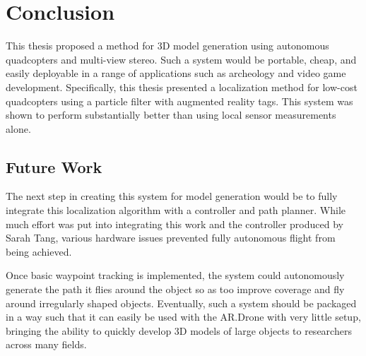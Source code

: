\chapter{Conclusion\label{ch:conclusion}}

This thesis proposed a method for 3D model generation using autonomous quadcopters and multi-view stereo. Such a system would be portable, cheap, and easily deployable in a range of applications such as archeology and video game development. 
Specifically, this thesis presented a localization method for low-cost quadcopters using a particle filter with augmented reality tags. This system was shown to perform substantially better than using local sensor measurements alone.

\section{Future Work}

The next step in creating this system for model generation would be to fully integrate this localization algorithm with a controller and path planner. While much effort was put into integrating this work and the controller produced by Sarah Tang, various hardware issues prevented fully autonomous flight from being achieved.

Once basic waypoint tracking is implemented, the system could autonomously generate the path it flies around the object so as too improve coverage and fly around irregularly shaped objects. Eventually, such a system should be packaged in a way such that it can easily be used with the AR.Drone with very little setup, bringing the ability to quickly develop 3D models of large objects to researchers across many fields.